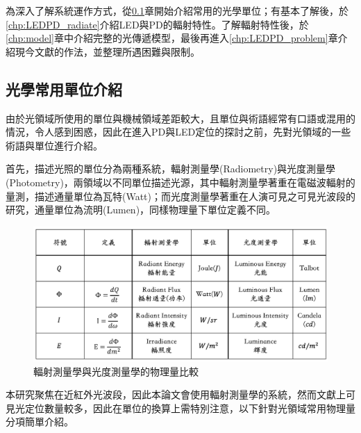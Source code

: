     為深入了解系統運作方式，從\ref{chp:light_unit}章開始介紹常用的光學單位；有基本了解後，於\ref{chp:LEDPD_radiate}介紹LED與PD的輻射特性。了解輻射特性後，於\ref{chp:model}章中介紹完整的光傳遞模型，最後再進入\ref{chp:LEDPD_problem}章介紹現今文獻的作法，並整理所遇困難與限制。



    \subsection{光學常用單位介紹}
    \label{chp:light_unit}
        
        由於光領域所使用的單位與機械領域差距較大，且單位與術語經常有口語或混用的情況，令人感到困惑，因此在進入PD與LED定位的探討之前，先對光領域的一些術語與單位進行介紹。

        首先，描述光照的單位分為兩種系統，輻射測量學(Radiometry)與光度測量學(Photometry)，兩領域以不同單位描述光源，其中輻射測量學著重在電磁波輻射的量測，描述通量單位為瓦特(Watt)；而光度測量學著重在人演可見之可見光波段的研究，通量單位為流明(Lumen)，同樣物理量下單位定義不同\cite{radiometry_and_photometry}。
        

        \begin{figure}[ht]
            \centering
            \includegraphics[width=14cm]{ch2pic/photometry_table.png}
            \caption{輻射測量學與光度測量學的物理量比較}
            \label{tab:photometry}
        \end{figure}


        本研究聚焦在近紅外光波段，因此本論文會使用輻射測量學的系統，然而文獻上可見光定位數量較多，因此在單位的換算上需特別注意，以下針對光領域常用物理量分項簡單介紹。

